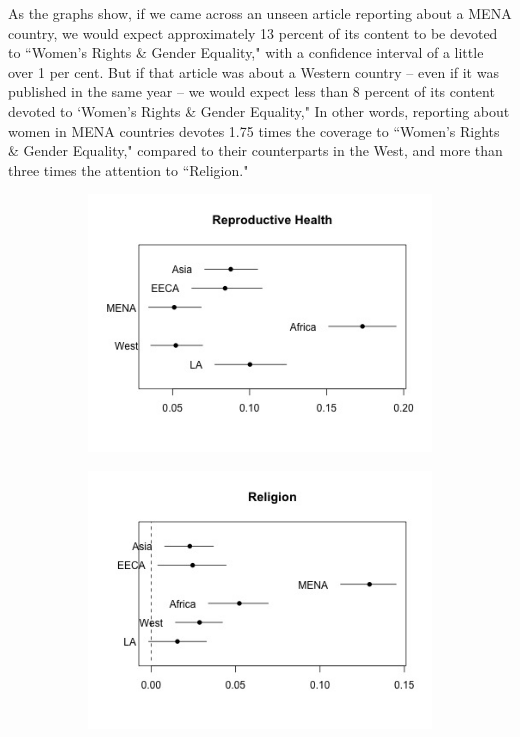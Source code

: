 \documentclass[11pt, oneside]{article}
\begin{document}
As the graphs show, if we came across an unseen article reporting about a MENA country, we would expect approximately 13 percent of its content to be devoted to ``Women's Rights \& Gender Equality," with a confidence interval of a little over 1 per cent.  But if that article was about a Western country -- even if it was published in the same year -- we would expect less than 8 percent of its content devoted to `Women's Rights \& Gender Equality," In other words, reporting about women in MENA countries devotes 1.75 times the coverage to ``Women's Rights \& Gender Equality," compared to their counterparts in the West, and more than three times the attention to ``Religion."

\begin{figure}
\begin{subfigure}{.5\textwidth}
  \centering
  \includegraphics[width=1\linewidth]{2}
  \label{fig:sfig1}
\end{subfigure}%
\begin{subfigure}{.5\textwidth}
  \centering
  \includegraphics[width=1\linewidth]{3}

\end{subfigure}
\end{figure}
\end{document}
